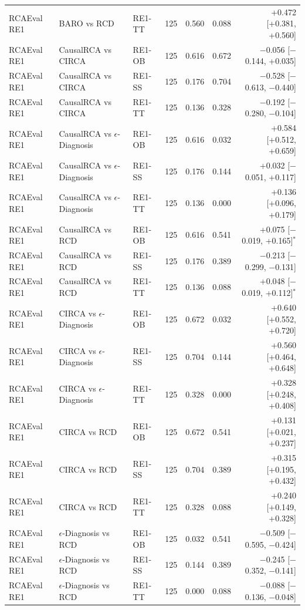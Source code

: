 {\begin{longtable}{llllrrr}
RCAEval RE1 & BARO vs RCD & RE1-TT & 125 & 0.560 & 0.088 & +0.472 [+0.381, +0.560] \\
RCAEval RE1 & CausalRCA vs CIRCA & RE1-OB & 125 & 0.616 & 0.672 & $-$0.056 [$-$0.144, +0.035] \\
RCAEval RE1 & CausalRCA vs CIRCA & RE1-SS & 125 & 0.176 & 0.704 & $-$0.528 [$-$0.613, $-$0.440] \\
RCAEval RE1 & CausalRCA vs CIRCA & RE1-TT & 125 & 0.136 & 0.328 & $-$0.192 [$-$0.280, $-$0.104] \\
RCAEval RE1 & CausalRCA vs $\epsilon$-Diagnosis & RE1-OB & 125 & 0.616 & 0.032 & +0.584 [+0.512, +0.659] \\
RCAEval RE1 & CausalRCA vs $\epsilon$-Diagnosis & RE1-SS & 125 & 0.176 & 0.144 & +0.032 [$-$0.051, +0.117] \\
RCAEval RE1 & CausalRCA vs $\epsilon$-Diagnosis & RE1-TT & 125 & 0.136 & 0.000 & +0.136 [+0.096, +0.179] \\
RCAEval RE1 & CausalRCA vs RCD & RE1-OB & 125 & 0.616 & 0.541 & +0.075 [$-$0.019, +0.165]$^\ast$ \\
RCAEval RE1 & CausalRCA vs RCD & RE1-SS & 125 & 0.176 & 0.389 & $-$0.213 [$-$0.299, $-$0.131] \\
RCAEval RE1 & CausalRCA vs RCD & RE1-TT & 125 & 0.136 & 0.088 & +0.048 [$-$0.019, +0.112]$^\ast$ \\
RCAEval RE1 & CIRCA vs $\epsilon$-Diagnosis & RE1-OB & 125 & 0.672 & 0.032 & +0.640 [+0.552, +0.720] \\
RCAEval RE1 & CIRCA vs $\epsilon$-Diagnosis & RE1-SS & 125 & 0.704 & 0.144 & +0.560 [+0.464, +0.648] \\
RCAEval RE1 & CIRCA vs $\epsilon$-Diagnosis & RE1-TT & 125 & 0.328 & 0.000 & +0.328 [+0.248, +0.408] \\
RCAEval RE1 & CIRCA vs RCD & RE1-OB & 125 & 0.672 & 0.541 & +0.131 [+0.021, +0.237] \\
RCAEval RE1 & CIRCA vs RCD & RE1-SS & 125 & 0.704 & 0.389 & +0.315 [+0.195, +0.432] \\
RCAEval RE1 & CIRCA vs RCD & RE1-TT & 125 & 0.328 & 0.088 & +0.240 [+0.149, +0.328] \\
RCAEval RE1 & $\epsilon$-Diagnosis vs RCD & RE1-OB & 125 & 0.032 & 0.541 & $-$0.509 [$-$0.595, $-$0.424] \\
RCAEval RE1 & $\epsilon$-Diagnosis vs RCD & RE1-SS & 125 & 0.144 & 0.389 & $-$0.245 [$-$0.352, $-$0.141] \\
RCAEval RE1 & $\epsilon$-Diagnosis vs RCD & RE1-TT & 125 & 0.000 & 0.088 & $-$0.088 [$-$0.136, $-$0.048] \\

\end{longtable}}
